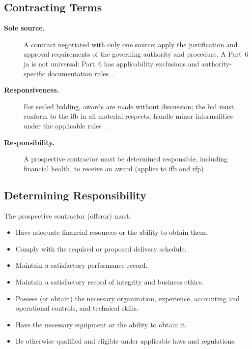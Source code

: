 \documentclass[../main.tex]{subfiles}
\begin{document}
\subsection{Contracting Terms}
\begin{description}
  \item[\textbf{Sole source.}] A contract negotiated with only one source; apply the justification and approval requirements of the governing authority and procedure. A Part~6 \ac{ja} is not universal: Part~6 has applicability exclusions and authority-specific documentation rules~\autocite{edo-3-2-1-intro-contracting-2025,FAR-Overhaul-Part6-2026}.
  \item[\textbf{Responsiveness.}] For sealed bidding, awards are made without discussion; the bid must conform to the \ac{ifb} in all material respects; handle minor informalities under the applicable rules~\autocite{edo-3-2-1-intro-contracting-2025,FAR-14-301-Responsiveness}.
  \item[\textbf{Responsibility.}] A prospective contractor must be determined responsible, including financial health, to receive an award (applies to \ac{ifb} and \ac{rfp})~\autocite{edo-3-2-1-intro-contracting-2025}.
\end{description}

\subsection{Determining Responsibility}
The prospective contractor (offeror) must:
\begin{itemize}
  \item Have adequate financial resources or the ability to obtain them.
  \item Comply with the required or proposed delivery schedule.
  \item Maintain a satisfactory performance record.
  \item Maintain a satisfactory record of integrity and business ethics.
  \item Possess (or obtain) the necessary organization, experience, accounting and operational controls, and technical skills.
  \item Have the necessary equipment or the ability to obtain it.
  \item Be otherwise qualified and eligible under applicable laws and regulations.
\end{itemize}
~\autocite{edo-3-2-1-intro-contracting-2025}
\end{document}
